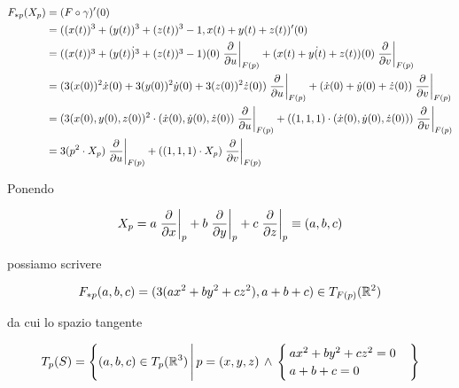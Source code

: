 {\begin{align}
	\begin{split}
		F_{*p}(X_{p}) &= (F \circ \gamma)' (0) \\
		&= ((x(t))^{3} + (y(t))^{3} + (z(t))^{3} - 1, x(t) + y(t) + z(t))' (0) \\
		&= \dot{ ((x(t))^{3} + (y(t))^{3} + (z(t))^{3} - 1) } (0) \eval{ \pdv{u} }_{F(p)} + \dot{ (x(t) + y(t) + z(t)) } (0) \eval{ \pdv{v} }_{F(p)} \\
		&= (3 (x(0))^{2} \dot{x}(0) + 3 (y(0))^{2} \dot{y}(0) + 3 (z(0))^{2} \dot{z}(0)) \eval{ \pdv{u} }_{F(p)} + (\dot{x}(0) + \dot{y}(0) + \dot{z}(0)) \eval{ \pdv{v} }_{F(p)} \\
		&= ( 3 (x(0), y(0), z(0))^{2} \cdot (\dot{x}(0), \dot{y}(0), \dot{z}(0)) \eval{ \pdv{u} }_{F(p)} + ( (1,1,1) \cdot (\dot{x}(0), \dot{y}(0), \dot{z}(0)) ) \eval{ \pdv{v} }_{F(p)} \\
		&= 3 ( p^{2} \cdot X_{p} ) \eval{ \pdv{u} }_{F(p)} + ( (1,1,1) \cdot X_{p} ) \eval{ \pdv{v} }_{F(p)}
	\end{split}
\end{align}

Ponendo

\begin{equation}
	X_{p} = a \eval{ \pdv{x} }_{p} + b \eval{ \pdv{y} }_{p} + c \eval{ \pdv{z} }_{p} %
	\equiv (a,b,c)
\end{equation}

possiamo scrivere

\begin{equation}
	F_{*p}(a,b,c) = ( 3 (a x^{2} + b y^{2} + c z^{2}), a + b + c ) \in T_{F(p)}(\mathbb{R}^{2})
\end{equation}

da cui lo spazio tangente

\begin{equation}
	T_{p}(S) = \left\{ (a,b,c) \in T_{p}(\R^{3}) \st p = (x,y,z) \, \wedge \, %
	\begin{cases}
		a x^{2} + b y^{2} + c z^{2} = 0 \\
		a + b + c = 0
	\end{cases} %
	\right\}
\end{equation}
}


